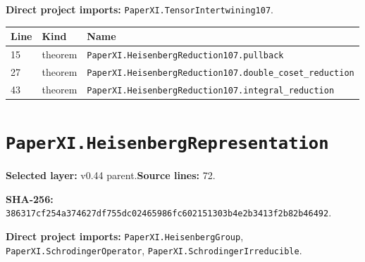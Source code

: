 \documentclass[10pt,oneside]{book}
\begin{document}

\textbf{Direct project imports:} \nolinkurl{PaperXI.TensorIntertwining107}.

\begin{longtable}{@{}p{}p{}p{}@{}}\toprule Line&Kind&Name\\\midrule\endhead

15&theorem&\nolinkurl{PaperXI.HeisenbergReduction107.pullback}\\

27&theorem&\nolinkurl{PaperXI.HeisenbergReduction107.double_coset_reduction}\\

43&theorem&\nolinkurl{PaperXI.HeisenbergReduction107.integral_reduction}\\

\bottomrule\end{longtable}

\section{\texorpdfstring{\nolinkurl{PaperXI.HeisenbergRepresentation}}{PaperXI.HeisenbergRepresentation}}\label{module:PaperXI.HeisenbergRepresentation}

\textbf{Selected layer:} v0.44 parent.\quad\textbf{Source lines:} 72.\par\textbf{SHA-256:} {\scriptsize\nolinkurl{386317cf254a374627df755dc02465986fc602151303b4e2b3413f2b82b46492}}.


\textbf{Direct project imports:} \nolinkurl{PaperXI.HeisenbergGroup}, \nolinkurl{PaperXI.SchrodingerOperator}, \nolinkurl{PaperXI.SchrodingerIrreducible}.
\end{document}
